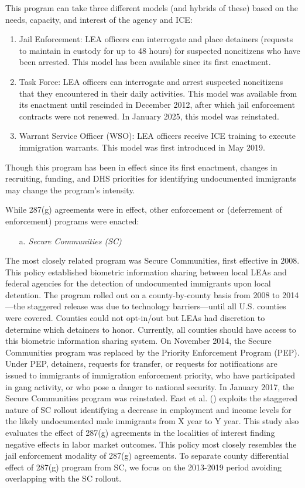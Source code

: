 \documentclass{article}
\begin{document}
This program can take three different models (and hybrids of these) based on the needs, capacity, and interest of the agency and ICE: 
\begin{enumerate}
    \item Jail Enforcement: LEA officers can interrogate and place detainers (requests to maintain in custody for up to 48 hours) for suspected noncitizens who have been arrested. This model has been available since its first enactment.
    \item Task Force: LEA officers can interrogate and arrest suspected noncitizens that they encountered in their daily activities. This model was available from its enactment until rescinded in December 2012, after which jail enforcement contracts were not renewed. In January 2025, this model was reinstated.  %
    \item Warrant Service Officer (WSO): LEA officers receive ICE training to execute immigration warrants. This model was first introduced in May 2019.
\end{enumerate}

Though this program has been in effect since its first enactment, changes in recruiting, funding, and DHS priorities for identifying undocumented immigrants may change the program's intensity.

While 287(g) agreements were in effect, other enforcement or (deferrement of enforcement) programs were enacted:
\begin{itemize}
    \item[a.] \textit{Secure Communities (SC)}
\end{itemize}


The most closely related program was Secure Communities, first effective in 2008. This policy established biometric information sharing between local LEAs and federal agencies for the detection of undocumented immigrants upon local detention. The program rolled out on a county-by-county basis from 2008 to 2014—the staggered release was due to technology barriers—until all U.S. counties were covered. Counties could not opt-in/out but LEAs had discretion to determine which detainers to honor. Currently, all counties should have access to this biometric information sharing system. On November 2014, the Secure Communities program was replaced by the Priority Enforcement Program (PEP). Under PEP, detainers, requests for transfer, or requests for notifications are issued to immigrants of immigration enforcement priority, who have participated in gang activity, or who pose a danger to national security. In January 2017, the Secure Communities program was reinstated. East et al. (\citeyear{east2023}) exploits the staggered nature of SC rollout identifying a decrease in employment and income levels for the likely undocumented male immigrants from X year to Y year. This study also evaluates the effect of 287(g) agreements in the localities of interest finding negative effects in labor market outcomes. This policy most closely resembles the jail enforcement modality of 287(g) agreements. To separate county differential effect of 287(g) program from SC, we focus on the 2013-2019 period avoiding overlapping with the SC rollout.
\end{document}
